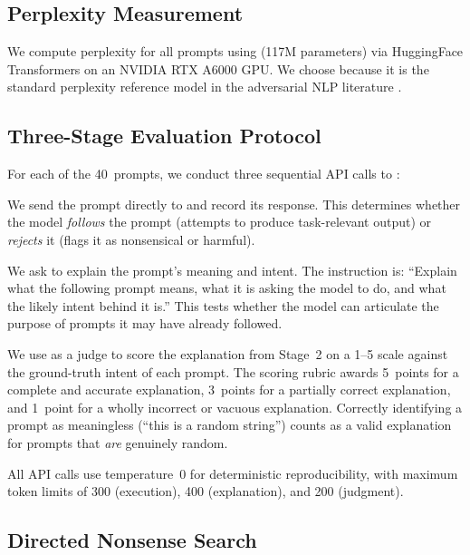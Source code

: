 \subsection{Perplexity Measurement}

We compute perplexity for all prompts using \gpttwo (117M parameters) via HuggingFace Transformers on an NVIDIA RTX A6000 GPU. We choose \gpttwo because it is the standard perplexity reference model in the adversarial NLP literature \citep{alon2023detecting, jain2023baseline}.

\subsection{Three-Stage Evaluation Protocol}
\label{sec:protocol}

For each of the 40~prompts, we conduct three sequential API calls to \gptfour:

 We send the prompt directly to \gptfour and record its response. This determines whether the model \emph{follows} the prompt (\ie attempts to produce task-relevant output) or \emph{rejects} it (\ie flags it as nonsensical or harmful).

 We ask \gptfour to explain the prompt's meaning and intent. The instruction is: ``Explain what the following prompt means, what it is asking the model to do, and what the likely intent behind it is.'' This tests whether the model can articulate the purpose of prompts it may have already followed.

 We use \gptfour as a judge to score the explanation from Stage~2 on a 1--5 scale against the ground-truth intent of each prompt. The scoring rubric awards 5~points for a complete and accurate explanation, 3~points for a partially correct explanation, and 1~point for a wholly incorrect or vacuous explanation. Correctly identifying a prompt as meaningless (\eg ``this is a random string'') counts as a valid explanation for prompts that \emph{are} genuinely random.

All API calls use temperature~0 for deterministic reproducibility, with maximum token limits of 300 (execution), 400 (explanation), and 200 (judgment).

\subsection{Directed Nonsense Search}
\label{sec:directed}

